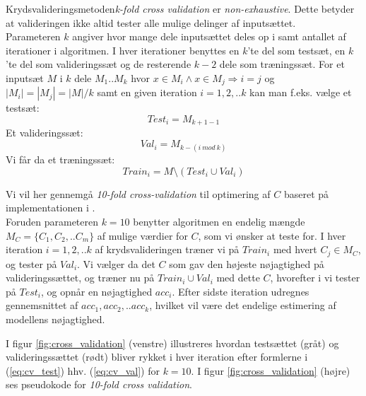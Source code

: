 \documentclass{article}
\begin{document}
Krydsvalideringsmetoden\textit{k-fold cross validation} er \textit{non-exhaustive}. Dette betyder at valideringen ikke altid tester alle mulige delinger af inputsættet.\\
Parameteren $k$ angiver hvor mange dele inputsættet deles op i samt antallet af iterationer i algoritmen. I hver iterationer benyttes en $k$'te del som testsæt, en $k$'te del som valideringssæt og de resterende $k-2$ dele som træningssæt. For et inputsæt $M$ i $k$ dele $M_1..M_k$ hvor $x\in M_i \land x\in M_j \Rightarrow i=j$ og $|M_i|=|M_j|=|M|/k$ samt en given iteration $i=1,2,..k$ kan man f.eks. vælge et testsæt:
\begin{equation}
\label{eq:cv_test}
Test_i = M_{k+1-1}
\end{equation}
Et valideringssæt:
\begin{equation}
\label{eq:cv_val}
Val_i = M_{k-(i\ mod\ k)}
\end{equation}
Vi får da et træningssæt:
\begin{equation}
Train_i = M\setminus \left(Test_i\cup Val_i\right)
\end{equation}

Vi vil her gennemgå \textit{10-fold cross-validation} til optimering af $C$ baseret på implementationen i \cite{libsvm}.\\
Foruden parameteren $k=10$ benytter algoritmen en endelig mængde $M_C=\{C_1,C_2,..C_m\}$ af mulige værdier for $C$, som vi ønsker at teste for. I hver iteration $i=1,2,..k$ af krydsvalideringen træner vi på $Train_i$ med hvert $C_j\in M_C$, og tester på $Val_i$. Vi vælger da det $C$ som gav den højeste nøjagtighed på valideringssættet, og træner nu på $Train_i\cup Val_i$ med dette $C$, hvorefter i vi tester på $Test_i$, og opnår en nøjagtighed $acc_i$. Efter sidste iteration udregnes gennemsnittet af $acc_1,acc_2,..acc_k$, hvilket vil være det endelige estimering af modellens nøjagtighed.

I figur \ref{fig:cross_validation} (venstre) illustreres hvordan testsættet (gråt) og valideringssættet (rødt) bliver rykket i hver iteration efter formlerne i (\ref{eq:cv_test}) hhv. (\ref{eq:cv_val}) for $k=10$. I figur \ref{fig:cross_validation} (højre) ses pseudokode for \textit{10-fold cross validation}. \\
\end{document}
